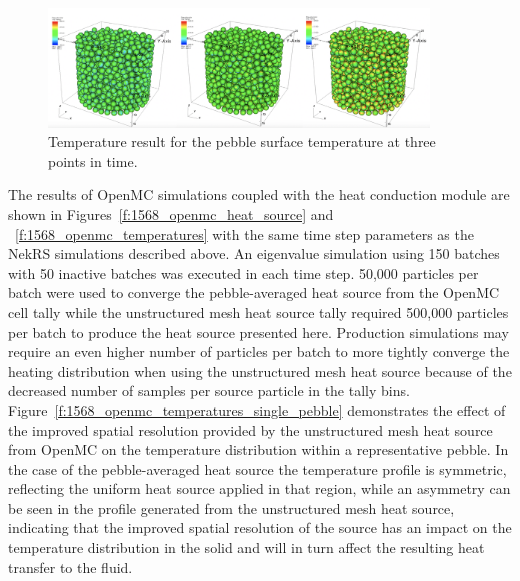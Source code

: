 \begin{figure}[!h]
\centering
\includegraphics[clip=true,width=0.9\textwidth]{Figures/ndemo_r4}
\caption{Temperature result for the pebble surface temperature at three points in time.}
\label{f:ndemo4}
\end{figure}

The results of OpenMC simulations coupled with the heat conduction module are
shown in Figures~\ref{f:1568_openmc_heat_source} and
~\ref{f:1568_openmc_temperatures} with the same time step parameters as the
NekRS simulations described above. An eigenvalue simulation using 150 batches
with 50 inactive batches was executed in each time step. 50,000 particles per
batch were used to converge the pebble-averaged heat source from the OpenMC cell
tally while the unstructured mesh heat source tally required 500,000 particles
per batch to produce the heat source presented here. Production simulations may
require an even higher number of particles per batch to more tightly converge
the heating distribution when using the unstructured mesh heat source because of the
decreased number of samples per source particle in the tally bins.
Figure~\ref{f:1568_openmc_temperatures_single_pebble} demonstrates the effect of
the improved spatial resolution provided by the unstructured mesh heat source
from OpenMC on the temperature distribution within a representative pebble. In
the case of the pebble-averaged heat source the temperature profile is
symmetric, reflecting the uniform heat source applied in that region, while an
asymmetry can be seen in the profile generated from the unstructured mesh heat
source, indicating that the improved spatial resolution of the source has an
impact on the temperature distribution in the solid and will in turn affect the
resulting heat transfer to the fluid.

